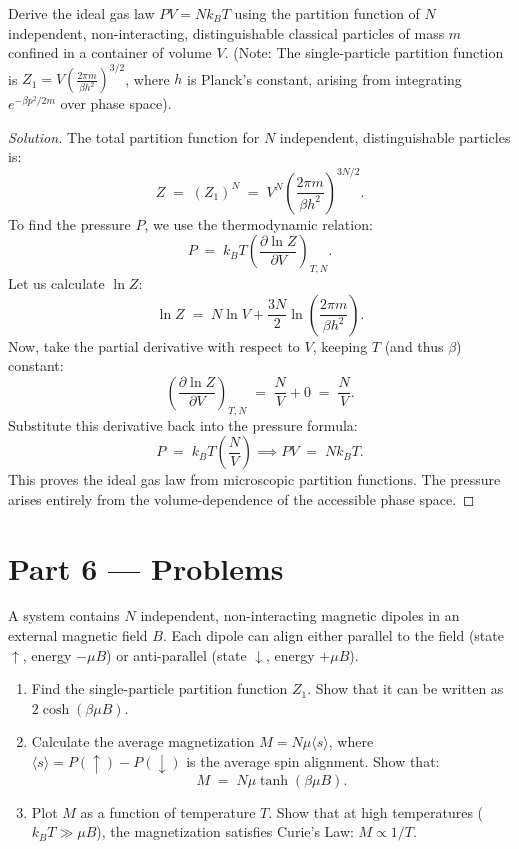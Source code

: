 \documentclass[12pt, a4paper, twoside]{book}
\newcounter{problem}[chapter]
\begin{document}
\begin{exercise}
Derive the ideal gas law $PV = N k_B T$ using the partition function of $N$ independent, non-interacting, distinguishable classical particles of mass $m$ confined in a container of volume $V$.
(Note: The single-particle partition function is $Z_1 = V \left(\frac{2\pi m}{\beta h^2}\right)^{3/2}$, where $h$ is Planck's constant, arising from integrating $e^{-\beta p^2/2m}$ over phase space).
\end{exercise}

\begin{proof}[Solution]
The total partition function for $N$ independent, distinguishable particles is:
\[
  Z \;=\; (Z_1)^N \;=\; V^N \left(\frac{2\pi m}{\beta h^2}\right)^{3N/2}.
\]
To find the pressure $P$, we use the thermodynamic relation:
\[
  P \;=\; k_B T \left( \frac{\partial \ln Z}{\partial V} \right)_{T, N}.
\]
Let us calculate $\ln Z$:
\[
  \ln Z \;=\; N \ln V + \frac{3N}{2} \ln\left(\frac{2\pi m}{\beta h^2}\right).
\]
Now, take the partial derivative with respect to $V$, keeping $T$ (and thus $\beta$) constant:
\[
  \left( \frac{\partial \ln Z}{\partial V} \right)_{T, N} \;=\; \frac{N}{V} + 0 \;=\; \frac{N}{V}.
\]
Substitute this derivative back into the pressure formula:
\[
  P \;=\; k_B T \left( \frac{N}{V} \right) \implies P V \;=\; N k_B T.
\]
This proves the ideal gas law from microscopic partition functions. The pressure arises entirely from the volume-dependence of the accessible phase space.
\end{proof}

\newpage

\section{Part 6 --- Problems}

\begin{problem}
A system contains $N$ independent, non-interacting magnetic dipoles in an external magnetic field $B$. Each dipole can align either parallel to the field (state $\uparrow$, energy $-\mu B$) or anti-parallel (state $\downarrow$, energy $+\mu B$).
\begin{enumerate}[label=(\alph*)]
  \item Find the single-particle partition function $Z_1$. Show that it can be written as $2 \cosh(\beta \mu B)$.
  \item Calculate the average magnetization $M = N \mu \langle s \rangle$, where $\langle s \rangle = P(\uparrow) - P(\downarrow)$ is the average spin alignment. Show that:
  \[
    M \;=\; N \mu \tanh(\beta \mu B).
  \]
  \item Plot $M$ as a function of temperature $T$. Show that at high temperatures ($k_B T \gg \mu B$), the magnetization satisfies Curie's Law: $M \propto 1/T$.
\end{enumerate}
\end{problem}
\end{document}
